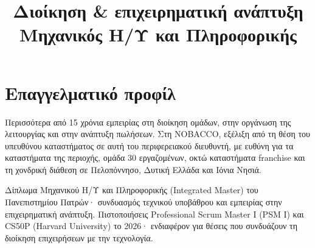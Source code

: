 \documentclass[10pt,a4paper,sans]{moderncv}
\title{Διοίκηση \& επιχειρηματική ανάπτυξη\texorpdfstring{\\}{ · }Μηχανικός Η/Υ και Πληροφορικής}  %
\let\cvsectionplain\section
\renewcommand*{\section}[1]{\par\ifdim\dimexpr\pagegoal-\pagetotal\relax<5\baselineskip\newpage\fi\cvsectionplain{#1}}
\begin{document}
\makecvtitle

\section{Επαγγελματικό προφίλ}
Περισσότερα από 15 χρόνια εμπειρίας στη διοίκηση ομάδων, στην οργάνωση της λειτουργίας και στην ανάπτυξη πωλήσεων. Στη NOBACCO, εξέλιξη από τη θέση του υπευθύνου καταστήματος σε αυτή του περιφερειακού διευθυντή, με ευθύνη για τα καταστήματα της περιοχής, ομάδα 30 εργαζομένων, οκτώ καταστήματα franchise και τη χονδρική διάθεση σε Πελοπόννησο, Δυτική Ελλάδα και Ιόνια Νησιά.

\smallskip
Δίπλωμα Μηχανικού Η/Υ και Πληροφορικής (Integrated Master) του Πανεπιστημίου Πατρών· συνδυασμός τεχνικού υποβάθρου και εμπειρίας στην επιχειρηματική ανάπτυξη. Πιστοποιήσεις Professional Scrum Master I (PSM I) και CS50P (Harvard University) το 2026· ενδιαφέρον για θέσεις που συνδυάζουν τη διοίκηση επιχειρήσεων με την τεχνολογία.
\end{document}
